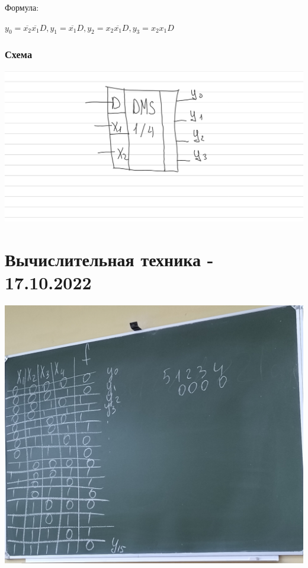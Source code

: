 \documentclass{article}
\begin{document}
\begin{flushleft}
\hfill

Формула:

$y_0 = \overline{x_2} \overline{x_1} D, y_1 = \overline{x_1}D, y_2 = x_2\overline{x_1}D, y_3 = x_2 x_1 D$

\subsubsection{Схема}

\includegraphics[width=\textwidth]{assets/demultiplexer.png}

\pagebreak
\section{Вычислительная техника - 17.10.2022}

\includegraphics[width=\textwidth]{assets/image_1.jpg}


\end{flushleft}
\end{document}

